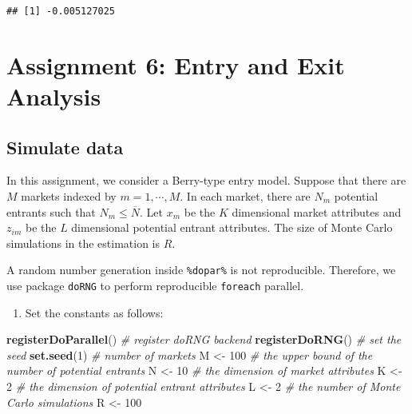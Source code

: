 \documentclass[
]{book}
\newenvironment{Shaded}{\begin{snugshade}}{\end{snugshade}}
\newcommand{\CommentTok}[1]{\textcolor[rgb]{0.56,0.35,0.01}{\textit{#1}}}
\newcommand{\DecValTok}[1]{\textcolor[rgb]{0.00,0.00,0.81}{#1}}
\newcommand{\FunctionTok}[1]{\textcolor[rgb]{0.13,0.29,0.53}{\textbf{#1}}}
\newcommand{\NormalTok}[1]{#1}
\newcommand{\OtherTok}[1]{\textcolor[rgb]{0.56,0.35,0.01}{#1}}
\providecommand{\tightlist}{%
  \setlength{\itemsep}{0pt}\setlength{\parskip}{0pt}}
\begin{document}
\begin{verbatim}
## [1] -0.005127025
\end{verbatim}

\hypertarget{assignment6}{%
\chapter{Assignment 6: Entry and Exit Analysis}\label{assignment6}}

\hypertarget{simulate-data-5}{%
\section{Simulate data}\label{simulate-data-5}}

In this assignment, we consider a Berry-type entry model. Suppose that there are \(M\) markets indexed by \(m = 1, \cdots, M\). In each market, there are \(N_m\) potential entrants such that \(N_m \le \overline{N}\). Let \(x_m\) be the \(K\) dimensional market attributes and \(z_{im}\) be the \(L\) dimensional potential entrant attributes. The size of Monte Carlo simulations in the estimation is \(R\).

A random number generation inside \texttt{\%dopar\%} is not reproducible. Therefore, we use package \texttt{doRNG} to perform reproducible \texttt{foreach} parallel.

\begin{enumerate}
\def\labelenumi{\arabic{enumi}.}
\tightlist
\item
  Set the constants as follows:
\end{enumerate}

\begin{Shaded}
\begin{Highlighting}[]
\FunctionTok{registerDoParallel}\NormalTok{()}
\CommentTok{\# register doRNG backend}
\FunctionTok{registerDoRNG}\NormalTok{()}
\CommentTok{\# set the seed}
\FunctionTok{set.seed}\NormalTok{(}\DecValTok{1}\NormalTok{)}
\CommentTok{\# number of markets}
\NormalTok{M }\OtherTok{\textless{}{-}} \DecValTok{100}
\CommentTok{\# the upper bound of the number of potential entrants}
\NormalTok{N }\OtherTok{\textless{}{-}} \DecValTok{10}
\CommentTok{\# the dimension of market attributes}
\NormalTok{K }\OtherTok{\textless{}{-}} \DecValTok{2}
\CommentTok{\# the dimension of potential entrant attributes}
\NormalTok{L }\OtherTok{\textless{}{-}} \DecValTok{2}
\CommentTok{\# the number of Monte Carlo simulations}
\NormalTok{R }\OtherTok{\textless{}{-}} \DecValTok{100}
\end{Highlighting}
\end{Shaded}
\end{document}
